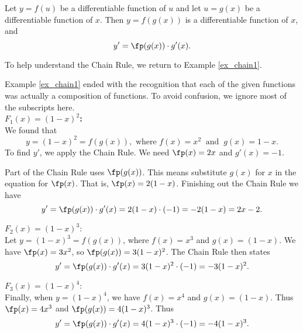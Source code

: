 {Let $y = f(u)$ be a differentiable function of $u$ and let $u = g(x)$ be a differentiable function of $x$. Then $y=f(g(x))$ is a differentiable function of $x$, and $$y' = \fp(g(x))\cdot g'(x).$$
}
  
 

To help  understand the Chain Rule, we return to Example \ref{ex_chain1}.\\

{Example \ref{ex_chain1} ended with the recognition that each of the given functions was actually a composition of functions. To avoid confusion, we ignore most of the subscripts here. \\ %

\noindent\textbf{$F_1(x) = (1-x)^2$:}\\

We found that $$y=(1-x)^2 = f(g(x)), \text{ where } f(x) = x^2\ \text{ and }\ g(x) = 1-x.$$
To find $y'$, we apply the Chain Rule. We need $\fp(x)=2x$ and $g'(x)=-1.$

Part of the Chain Rule uses $\fp(g(x))$. This means substitute $g(x)$ for $x$ in the equation for $\fp(x)$. That is, $\fp(x) = 2(1-x)$.  Finishing out the Chain Rule we have $$y' = \fp(g(x))\cdot g'(x) = 2(1-x)\cdot (-1) = -2(1-x)= 2x-2.$$

\noindent $F_2(x) = (1-x)^3$:\\

Let $y = (1-x)^3 = f(g(x))$, where $f(x) = x^3$ and $g(x) = (1-x)$. We have $\fp(x) = 3x^2$, so $\fp(g(x)) = 3(1-x)^2$. The Chain Rule then states $$y' = \fp(g(x))\cdot g'(x) = 3(1-x)^2\cdot(-1) = -3(1-x)^2.$$

\enlargethispage{2\baselineskip}%
\noindent $F_3(x) = (1-x)^4$:\\

Finally, when $y = (1-x)^4$, we have $f(x)= x^4$ and $g(x) = (1-x)$. Thus $\fp(x) = 4x^3$ and $\fp(g(x)) = 4(1-x)^3$. Thus $$y' = \fp(g(x))\cdot g'(x) = 4(1-x)^3\cdot (-1) = -4(1-x)^3.$$
\baselineskip
}\\

